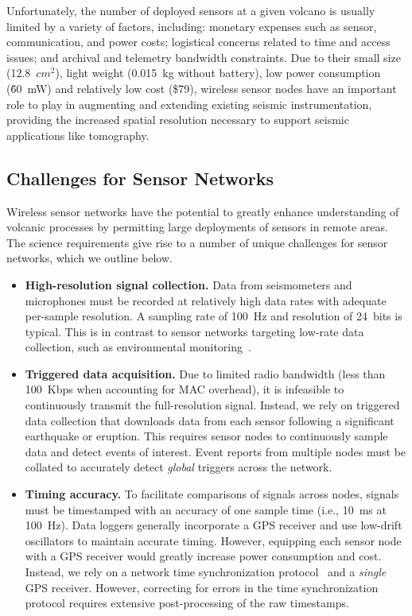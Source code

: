Unfortunately, the number of deployed sensors at a given volcano is usually
limited by a variety of factors, including: monetary expenses such as sensor,
communication, and power costs; logistical concerns related to time and
access issues; and archival and telemetry bandwidth constraints. Due to their
small size (12.8~$cm^2$), light weight (0.015~kg without battery), low power
consumption (\~60~mW) and relatively low cost (\$79), wireless sensor nodes
have an important role to play in augmenting and extending existing seismic
instrumentation, providing the increased spatial resolution necessary to
support seismic applications like tomography.

\subsection{Challenges for Sensor Networks}

Wireless sensor networks have the potential to greatly enhance understanding
of volcanic processes by permitting large deployments of sensors in remote
areas. The science requirements give rise to a number of unique challenges
for sensor networks, which we outline below.

\begin{itemize}

\item \textbf{High-resolution signal collection.} Data from seismometers and
microphones must be recorded at relatively high data rates with adequate
per-sample resolution. A sampling rate of 100~Hz and resolution of 24~bits is
typical. This is in contrast to sensor networks targeting low-rate data
collection, such as environmental
monitoring~\cite{gdi-sensys04,berkeley-redwoods}.

\item \textbf{Triggered data acquisition.} Due to limited radio bandwidth
(less than 100~Kbps when accounting for MAC overhead), it is infeasible to
continuously transmit the full-resolution signal. Instead, we rely on
triggered data collection that downloads data from each sensor following a
significant earthquake or eruption. This requires sensor nodes to
continuously sample data and detect events of interest. Event reports from
multiple nodes must be collated to accurately detect \textit{global} triggers
across the network.

\item \textbf{Timing accuracy.} To facilitate comparisons of signals across
nodes, signals must be timestamped with an accuracy of one sample time (i.e.,
10~ms at 100~Hz). Data loggers generally incorporate a GPS receiver and use
low-drift oscillators to maintain accurate timing. However, equipping each
sensor node with a GPS receiver would greatly increase power consumption and
cost. Instead, we rely on a network time synchronization
protocol~\cite{rbs,ftsp} and a \textit{single} GPS receiver. However,
correcting for errors in the time synchronization protocol requires extensive
post-processing of the raw timestamps.

\end{itemize}
